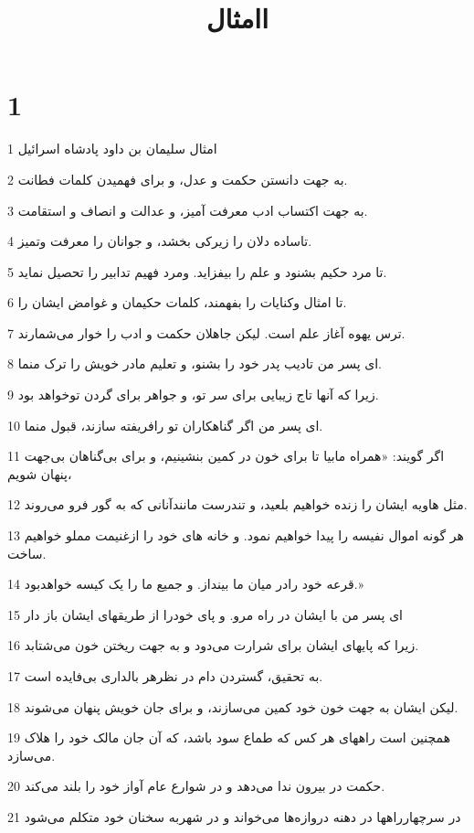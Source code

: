 

\title{اامثال}

 
\chapter{1}

\par 1 امثال سلیمان بن داود پادشاه اسرائیل
\par 2 به جهت دانستن حکمت و عدل، و برای فهمیدن کلمات فطانت.
\par 3 به جهت اکتساب ادب معرفت آمیز، و عدالت و انصاف و استقامت.
\par 4 تاساده دلان را زیرکی بخشد، و جوانان را معرفت وتمیز.
\par 5 تا مرد حکیم بشنود و علم را بیفزاید. ومرد فهیم تدابیر را تحصیل نماید.
\par 6 تا امثال وکنایات را بفهمند، کلمات حکیمان و غوامض ایشان را.
\par 7 ترس یهوه آغاز علم است. لیکن جاهلان حکمت و ادب را خوار می‌شمارند.
\par 8 ‌ای پسر من تادیب پدر خود را بشنو، و تعلیم مادر خویش را ترک منما.
\par 9 زیرا که آنها تاج زیبایی برای سر تو، و جواهر برای گردن توخواهد بود.
\par 10 ‌ای پسر من اگر گناهکاران تو رافریفته سازند، قبول منما.
\par 11 اگر گویند: «همراه مابیا تا برای خون در کمین بنشینیم، و برای بی‌گناهان بی‌جهت پنهان شویم،
\par 12 مثل هاویه ایشان را زنده خواهیم بلعید، و تندرست مانندآنانی که به گور فرو می‌روند.
\par 13 هر گونه اموال نفیسه را پیدا خواهیم نمود. و خانه های خود را ازغنیمت مملو خواهیم ساخت.
\par 14 قرعه خود رادر میان ما بینداز. و جمیع ما را یک کیسه خواهدبود.»
\par 15 ‌ای پسر من با ایشان در راه مرو. و پای خودرا از طریقهای ایشان باز دار
\par 16 زیرا که پایهای ایشان برای شرارت می‌دود و به جهت ریختن خون می‌شتابد.
\par 17 به تحقیق، گستردن دام در نظرهر بالداری بی‌فایده است.
\par 18 لیکن ایشان به جهت خون خود کمین می‌سازند، و برای جان خویش پنهان می‌شوند.
\par 19 همچنین است راههای هر کس که طماع سود باشد، که آن جان مالک خود را هلاک می‌سازد.
\par 20 حکمت در بیرون ندا می‌دهد و در شوارع عام آواز خود را بلند می‌کند.
\par 21 در سرچهارراهها در دهنه دروازه‌ها می‌خواند و در شهربه سخنان خود متکلم می‌شود
